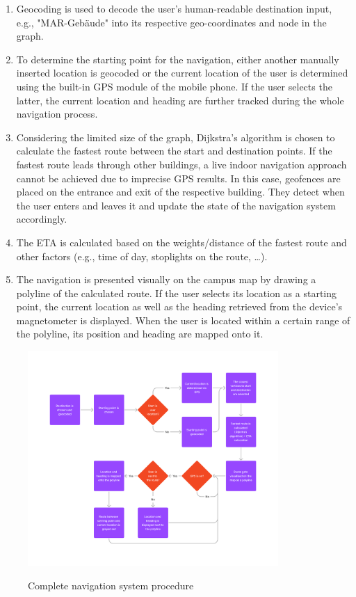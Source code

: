 \begin{enumerate}
    \item Geocoding is used to decode the user's human-readable destination input, e.g., "MAR-Gebäude" into its respective geo-coordinates and node in the graph.
    \item To determine the starting point for the navigation, either another manually inserted location is geocoded or the current location of the user is determined using the built-in GPS module of the mobile phone. If the user selects the latter, the current location and heading are further tracked during the whole navigation process.
    \item Considering the limited size of the graph, Dijkstra's algorithm is chosen to calculate the fastest route between the start and destination points. If the fastest route leads through other buildings, a live indoor navigation approach cannot be achieved due to imprecise GPS results. In this case, geofences are placed on the entrance and exit of the respective building. They detect when the user enters and leaves it and update the state of the navigation system accordingly.
    \item The ETA is calculated based on the weights/distance of the fastest route and other factors (e.g., time of day, stoplights on the route, \ldots).
    \item The navigation is presented visually on the campus map by drawing a polyline of the calculated route. If the user selects its location as a starting point, the current location as well as the heading retrieved from the device's magnetometer is displayed. When the user is located within a certain range of the polyline, its position and heading are mapped onto it.
\end{enumerate}

\begin{figure}[!ht]
	\centering
	\includegraphics[width=0.85\textwidth]{images/navigation_process.png}\\
	\caption{Complete navigation system procedure}
\end{figure}


